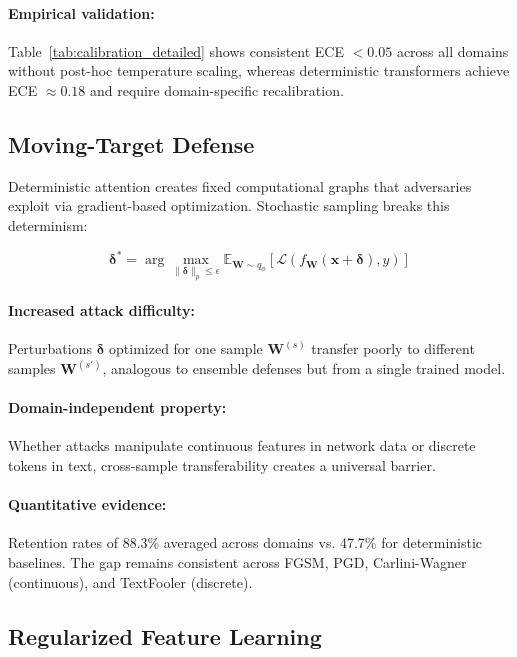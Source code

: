 \documentclass[12pt,a4paper]{article}
\theoremstyle{definition}
\begin{document}
\paragraph{Empirical validation:} Table~\ref{tab:calibration_detailed} shows consistent ECE $<0.05$ across all domains without post-hoc temperature scaling, whereas deterministic transformers achieve ECE $\approx 0.18$ and require domain-specific recalibration.

\subsection{Moving-Target Defense}

Deterministic attention creates fixed computational graphs that adversaries exploit via gradient-based optimization. Stochastic sampling breaks this determinism:

\begin{equation}
\bm{\delta}^* = \arg\max_{\|\bm{\delta}\|_p \leq \epsilon} \mathbb{E}_{\bm{W} \sim q_\phi} [\mathcal{L}(f_{\bm{W}}(\bm{x} + \bm{\delta}), y)]
\end{equation}

\paragraph{Increased attack difficulty:} Perturbations $\bm{\delta}$ optimized for one sample $\bm{W}^{(s)}$ transfer poorly to different samples $\bm{W}^{(s')}$, analogous to ensemble defenses but from a single trained model.

\paragraph{Domain-independent property:} Whether attacks manipulate continuous features in network data or discrete tokens in text, cross-sample transferability creates a universal barrier.

\paragraph{Quantitative evidence:} Retention rates of 88.3\% averaged across domains vs. 47.7\% for deterministic baselines. The gap remains consistent across FGSM, PGD, Carlini-Wagner (continuous), and TextFooler (discrete).

\subsection{Regularized Feature Learning}
\end{document}
